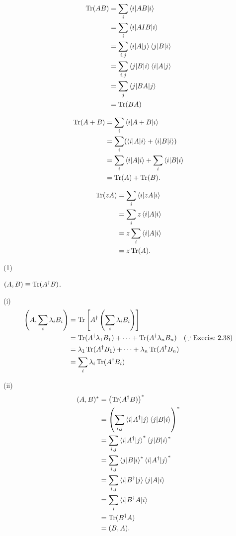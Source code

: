 \begin{align*}
	\operatorname{Tr} (AB) &= \sum_i \braket{i | AB | i}\\
		&=\sum_i \braket{i | A I B | i}\\
		&= \sum_{i,j} \braket{i | A | j}\braket{j | B | i}\\
		&= \sum_{i,j} \braket{j | B | i} \braket{i | A | j}\\
		&= \sum_j \braket{j | BA | j}\\
		&= \operatorname{Tr} (BA)
\end{align*}

\begin{align*}
	\operatorname{Tr} (A + B) &= \sum_i \braket{i | A+B | i}\\
		&= \sum_i (\braket{i|A|i}  + \braket{i | B | i}  )\\
		&= \sum_i \braket{i|A|i} + \sum_i \braket{i|B|i}\\
		&= \operatorname{Tr} (A) + \operatorname{Tr} (B).
\end{align*}

\begin{align*}
	\operatorname{Tr} (z A) &=  \sum_i \braket{i | z A | i}\\	
		&= \sum_i z \braket{i | A | i}\\
		&= z \sum_i \braket{i | A | i}\\
		&= z \operatorname{Tr} (A).
\end{align*}



(1)

$(A, B) \equiv \operatorname{Tr} (A^\dagger B)$.

\vspace{5mm}
(i)
\begin{align*}
	\left(A, \sum_i \lambda_i B_i \right) &= \operatorname{Tr} \left[ A^\dagger \left(\sum_i \lambda_i B_i  \right) \right]\\
		&= \operatorname{Tr} (A^\dagger \lambda_1 B_1) + \cdots +  \operatorname{Tr} (A^\dagger \lambda_n B_n) ~~~ (\because \text{Execise 2.38}) \\
		&= \lambda_1 \operatorname{Tr} (A^\dagger B_1)  + \cdots  + \lambda_n \operatorname{Tr} (A^\dagger B_n) \\
		&= \sum_i \lambda_i \operatorname{Tr} (A^\dagger B_i)
\end{align*}


(ii)
\begin{align*}
	(A, B)^* &= \left( \operatorname{Tr} (A^\dagger B) \right)^*\\
		&= \left(\sum_{i,j} \braket{ i | A^\dagger | j} \braket{j | B | i}  \right)^*\\
		&= \sum_{i,j} \braket{ i | A^\dagger | j}^* \braket{j | B | i}^*\\
		&= \sum_{i,j}  \braket{j | B | i}^* \braket{ i | A^\dagger | j}^*\\
		&=  \sum_{i,j}  \braket{i | B^\dagger | j} \braket{ j | A | i}\\
		&= \sum_i \braket{i | B^\dagger A | i} \\
		&= \operatorname{Tr} (B^\dagger A)\\
		&= (B, A).
\end{align*}


